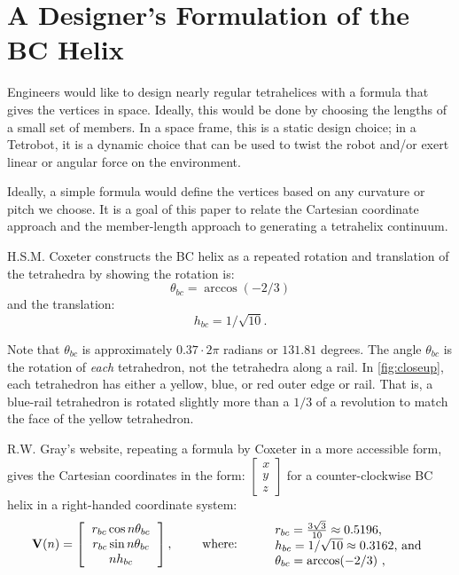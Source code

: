 \documentclass[10pt,final]{journals-1.0/asme2ej}
\renewcommand{\vec}[1]{\mathbf{#1}}
\begin{document}
\section{A Designer's Formulation of the BC Helix}

Engineers would like to design nearly regular tetrahelices with a formula that
gives the vertices in space. Ideally, this would be done
by choosing the lengths of a small set of members.
In a space frame, this is a static design choice; in a Tetrobot, it is a
dynamic choice that can be used to twist the robot and/or exert linear or
angular force on the environment.

Ideally, a simple formula would define the vertices based on
any curvature or pitch we choose. It is a goal of
this paper to relate the Cartesian coordinate approach and the member-length approach to
generating a tetrahelix continuum.


H.S.M. Coxeter constructs the BC helix\cite{coxeter1985simplicial} as a repeated rotation and
translation of the tetrahedra by showing the
rotation is:
\begin{equation}
\theta_{bc} = \arccos(-2/3) 
\end{equation}
and the translation:
\begin{equation}
h_{bc} = 1/\sqrt{10}.
\end{equation}

Note that $\theta_{bc}$ is approximately $0.37 \cdot 2 \pi$ radians or  $131.81$ degrees.
The angle $\theta_{bc}$ is the rotation of \emph{each} tetrahedron, not the tetrahedra along a rail.  In \cref{fig:closeup},
each tetrahedron has either a yellow, blue, or red outer edge or rail.
That is, a blue-rail tetrahedron is rotated slightly more than a $1/3$ of a revolution to match the face of the yellow tetrahedron.

R.W. Gray's website\cite{graytetrahelix}, repeating a formula by Coxeter\cite{coxeter1985simplicial} in a more accessible form, gives the Cartesian coordinates in the form: $\begin{bmatrix}
           x \\
           y \\
           z
         \end{bmatrix}$
for a counter-clockwise BC helix in a right-handed coordinate system:
\begin{equation}
  \label{graycoxeter}
\vec{V}(n) =
\left [
  \begin{tabular}{c}
   $ r_{bc} \cos{n \theta_{bc}} $\\
   $ r_{bc} \sin{n \theta_{bc}} $\\
   $ n h_{bc}  $
  \end{tabular}
  \right ],
\text{ \qquad where: \qquad}
  \begin{tabular}{l}
 $ r_{bc} = \frac{3\sqrt{3}}{10} \approx 0.5196 $,\\
 $ h_{bc} = 1/\sqrt{10} \approx 0.3162 $, and \\
 $ \theta_{bc} = \arccos(-2/3) $  \text{,}\\
  \end{tabular}      
\end{equation}
\end{document}
